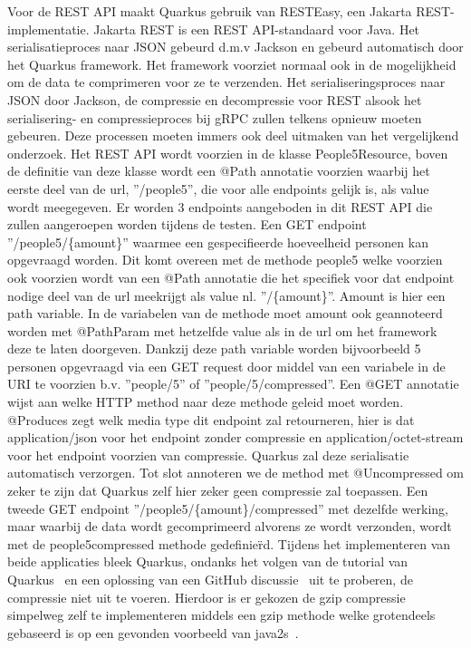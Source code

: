 Voor de REST API maakt Quarkus gebruik van RESTEasy, een Jakarta REST-implementatie. Jakarta REST is een REST API-standaard voor Java.
Het serialisatieproces naar JSON gebeurd d.m.v Jackson en gebeurd automatisch door het Quarkus framework.
Het framework voorziet normaal ook in de mogelijkheid om de data te comprimeren voor ze te verzenden.
Het serialiseringsproces naar JSON door Jackson, de compressie en decompressie voor REST alsook het serialisering- en compressieproces bij gRPC zullen telkens opnieuw moeten gebeuren.
Deze processen moeten immers ook deel uitmaken van het vergelijkend onderzoek.
Het REST API wordt voorzien in de klasse People5Resource, boven de definitie van deze klasse wordt een @Path annotatie voorzien waarbij
het eerste deel van de url, ''/people5'', die voor alle endpoints gelijk is, als value wordt meegegeven.
Er worden 3 endpoints aangeboden in dit REST API die zullen aangeroepen worden tijdens de testen. Een GET endpoint ''/people5/\{amount\}'' waarmee een gespecifieerde hoeveelheid
personen kan opgevraagd worden. Dit komt overeen met de methode people5 welke voorzien ook voorzien wordt van een @Path annotatie
die het specifiek voor dat endpoint nodige deel van de url meekrijgt als value nl. ''/\{amount\}''. Amount is hier een path variable. In de variabelen van
de methode moet amount ook geannoteerd worden met @PathParam met hetzelfde value als in de url om het framework deze te laten doorgeven.
Dankzij deze path variable worden bijvoorbeeld 5 personen opgevraagd via een GET request door middel van een variabele in de URI te voorzien b.v.
''people/5'' of ''people/5/compressed''.
Een @GET annotatie wijst aan welke HTTP method naar deze methode geleid moet worden. @Produces zegt welk media type dit endpoint zal retourneren, hier is dat application/json
voor het endpoint zonder compressie en application/octet-stream voor het endpoint voorzien van compressie.
Quarkus zal deze serialisatie automatisch verzorgen. Tot slot annoteren we de method met @Uncompressed om zeker te zijn dat Quarkus zelf hier zeker geen compressie zal toepassen.
Een tweede GET endpoint ''/people5/\{amount\}/compressed'' met dezelfde werking, maar waarbij de data wordt gecomprimeerd alvorens ze wordt verzonden,
wordt met de people5compressed methode gedefinie\"rd. Tijdens het implementeren van beide applicaties bleek Quarkus, ondanks het volgen van de tutorial van Quarkus~\parencite{quarkusgzipcompressie}
en een oplossing van een GitHub discussie~\parencite{quarkusgzipcompressiegithub} uit te proberen, de compressie niet uit te voeren.
Hierdoor is er gekozen de gzip compressie simpelweg zelf te implementeren middels een gzip methode welke grotendeels gebaseerd is op een gevonden voorbeeld van java2s~\parencite{gzipCompressie}.
